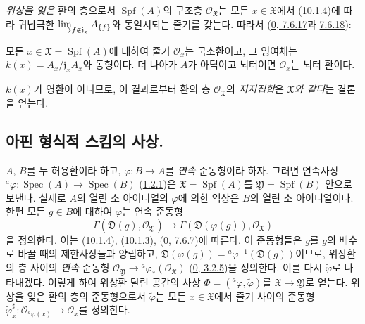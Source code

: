 \begin{env}[10.1.5]
\label{I.10.1.5-ko}
\emph{위상을 잊은} 환의 층으로서 $\operatorname{Spf}(A)$의 구조층
$\mathscr{O}_{\mathfrak{X}}$는 모든 $x\in\mathfrak{X}$에서
(\hyperref[I.10.1.4-ko]{10.1.4})에 따라 귀납극한
$\varinjlim_{f\notin\mathfrak{j}_x}A_{\{f\}}$와 동일시되는 줄기를 갖는다.
따라서 (\hyperref[0.7.6.17-ko]{0, 7.6.17}과
\hyperref[0.7.6.18-ko]{7.6.18}):
\end{env}

\begin{proposition}[10.1.6]
\label{I.10.1.6-ko}
모든 $x\in\mathfrak{X}=\operatorname{Spf}(A)$에 대하여 줄기
$\mathscr{O}_x$는 국소환이고, 그 잉여체는
$k(x)=A_x/\mathfrak{j}_xA_x$와 동형이다. 더 나아가 $A$가 아딕이고
뇌터이면 $\mathscr{O}_x$는 뇌터 환이다.
\end{proposition}

$k(x)$가 영환이 아니므로, 이 결과로부터 환의 층
$\mathscr{O}_{\mathfrak{X}}$의 \emph{지지집합}은
\emph{$\mathfrak{X}$와 같다}는 결론을 얻는다.

\subsection{아핀 형식적 스킴의 사상.}
\label{subsection:I.10.2-ko}

\begin{env}[10.2.1]
\label{I.10.2.1-ko}
$A$, $B$를 두 허용환이라 하고,
$\varphi:B\to A$를 \emph{연속} 준동형이라 하자. 그러면 연속사상
$ {}^a\varphi:\operatorname{Spec}(A)\to\operatorname{Spec}(B)$
(\hyperref[I.1.2.1-ko]{1.2.1})은
$\mathfrak{X}=\operatorname{Spf}(A)$를
$\mathfrak{Y}=\operatorname{Spf}(B)$ 안으로 보낸다. 실제로 $A$의 열린
소 아이디얼의 $\varphi$에 의한 역상은 $B$의 열린 소 아이디얼이다.
한편 모든 $g\in B$에 대하여 $\varphi$는 연속 준동형
\[
  \Gamma(\mathfrak{D}(g),\mathscr{O}_{\mathfrak{Y}})
  \longrightarrow
  \Gamma(\mathfrak{D}(\varphi(g)),\mathscr{O}_{\mathfrak{X}})
\]
을 정의한다. 이는 (\hyperref[I.10.1.4-ko]{10.1.4}),
(\hyperref[I.10.1.3-ko]{10.1.3}),
(\hyperref[0.7.6.7-ko]{0, 7.6.7})에 따른다. 이 준동형들은 $g$를 $g$의
배수로 바꿀 때의 제한사상들과 양립하고,
$\mathfrak{D}(\varphi(g))={}^a\varphi^{-1}(\mathfrak{D}(g))$이므로,
위상환의 층 사이의 \emph{연속} 준동형
$\mathscr{O}_{\mathfrak{Y}}\to
{}^a\varphi_*(\mathscr{O}_{\mathfrak{X}})$
(\hyperref[0.3.2.5-ko]{0, 3.2.5})을 정의한다. 이를 다시
$\widetilde{\varphi}$로 나타내겠다. 이렇게 하여 위상환 달린 공간의 사상
$\Phi=({}^a\varphi,\widetilde{\varphi})$를
$\mathfrak{X}\to\mathfrak{Y}$로 얻는다. 위상을 잊은 환의 층의
준동형으로서 $\widetilde{\varphi}$는 모든 $x\in\mathfrak{X}$에서 줄기
사이의 준동형
$\widetilde{\varphi}_x^\sharp:
\mathscr{O}_{{}^a\varphi(x)}\to\mathscr{O}_x$를 정의한다.
\end{env}

